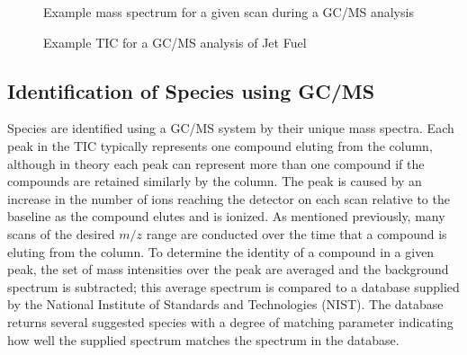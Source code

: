 \documentclass[../main.tex]{subfiles}
\begin{document}
\begin{figure}
    \begin{floatrow}
            {\caption{Example mass spectrum for a given scan during a GC/MS analysis}
            \label{fig:gcms-mass-spec}}
            {\caption{Example TIC for a GC/MS analysis of Jet Fuel}
            \label{fig:gcms-tic}}
    \end{floatrow}
\end{figure}

\subsection{Identification of Species using GC/MS}

Species are identified using a GC/MS system by their unique mass spectra.
Each peak in the TIC typically represents one compound eluting from the
column, although in theory each peak can represent more than one compound
if the compounds are retained similarly by the column. The peak is caused
by an increase in the number of ions reaching the detector on each scan
relative to the baseline as the compound elutes and is ionized. As
mentioned previously, many scans of the desired $m/z$ range are
conducted over the time that a compound is eluting from the column.
To determine the identity of a compound in a given peak, the set of
mass intensities over the peak are averaged and the background
spectrum is subtracted; this average spectrum is compared to a
database supplied by the National Institute of Standards and
Technologies (NIST). The database returns several suggested species
with a degree of matching parameter indicating how well the supplied
spectrum matches the spectrum in the database.

\end{document}
